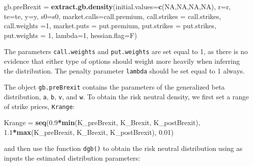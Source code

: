 \documentclass[]{book}
\newenvironment{Shaded}{\begin{snugshade}}{\end{snugshade}}
\newcommand{\KeywordTok}[1]{\textcolor[rgb]{0.13,0.29,0.53}{\textbf{#1}}}
\newcommand{\DataTypeTok}[1]{\textcolor[rgb]{0.13,0.29,0.53}{#1}}
\newcommand{\DecValTok}[1]{\textcolor[rgb]{0.00,0.00,0.81}{#1}}
\newcommand{\FloatTok}[1]{\textcolor[rgb]{0.00,0.00,0.81}{#1}}
\newcommand{\StringTok}[1]{\textcolor[rgb]{0.31,0.60,0.02}{#1}}
\newcommand{\OtherTok}[1]{\textcolor[rgb]{0.56,0.35,0.01}{#1}}
\newcommand{\OperatorTok}[1]{\textcolor[rgb]{0.81,0.36,0.00}{\textbf{#1}}}
\newcommand{\NormalTok}[1]{#1}
\theoremstyle{definition}
\theoremstyle{definition}
\theoremstyle{definition}
\theoremstyle{remark}
\begin{document}
\begin{Shaded}
\begin{Highlighting}[]
\NormalTok{gb.preBrexit =}\StringTok{ }\KeywordTok{extract.gb.density}\NormalTok{(}\DataTypeTok{initial.values=}\KeywordTok{c}\NormalTok{(}\OtherTok{NA}\NormalTok{,}\OtherTok{NA}\NormalTok{,}\OtherTok{NA}\NormalTok{,}\OtherTok{NA}\NormalTok{), }\DataTypeTok{r=}\NormalTok{r, }\DataTypeTok{te=}\NormalTok{te, }\DataTypeTok{y=}\NormalTok{y, }\DataTypeTok{s0=}\NormalTok{s0, }
                       \DataTypeTok{market.calls=}\NormalTok{call.premium, }\DataTypeTok{call.strikes =}\NormalTok{ call.strikes, }\DataTypeTok{call.weights =}\DecValTok{1}\NormalTok{,}
                       \DataTypeTok{market.puts =}\NormalTok{ put.premium, }\DataTypeTok{put.strikes =}\NormalTok{ put.strikes, }\DataTypeTok{put.weights =} \DecValTok{1}\NormalTok{,  }
                       \DataTypeTok{lambda=}\DecValTok{1}\NormalTok{, }\DataTypeTok{hessian.flag=}\NormalTok{F)}
\end{Highlighting}
\end{Shaded}

The parameters \texttt{call.weights} and \texttt{put.weights} are set
equal to 1, as there is no evidence that either type of options should
weight more heavily when inferring the distribution. The penalty
parameter \texttt{lambda} should be set equal to 1 always.

The object \texttt{gb.preBrexit} contains the parameters of the
generalized beta distribution, \texttt{a}, \texttt{b}, \texttt{v}, and
\texttt{w}. To obtain the risk neutral density, we first set a range of
strike prices, \texttt{Krange}:

\begin{Shaded}
\begin{Highlighting}[]
\NormalTok{Krange =}\StringTok{ }\KeywordTok{seq}\NormalTok{(}\FloatTok{0.9}\OperatorTok{*}\KeywordTok{min}\NormalTok{(K_preBrexit, K_Brexit, K_postBrexit), }\FloatTok{1.1}\OperatorTok{*}\KeywordTok{max}\NormalTok{(K_preBrexit, K_Brexit, K_postBrexit), }\FloatTok{0.01}\NormalTok{)}
\end{Highlighting}
\end{Shaded}

and then use the function \texttt{dgb()} to obtain the risk neutral
distribution using as inputs the estimated distribution parameters:

\begin{Shaded}
\end{Shaded}
\end{document}
